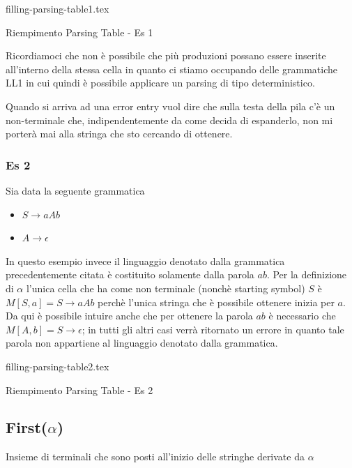 \documentclass[class=book, crop=false, oneside, 12pt]{standalone}
\begin{document}
\begin{table}[H]
	\centering
	{filling-parsing-table1.tex}
    \caption{Riempimento Parsing Table - Es 1}
    \label{filling-parsing-table1}
\end{table} 

Ricordiamoci che non è possibile che più produzioni possano essere inserite all'interno della stessa cella in quanto ci stiamo occupando delle grammatiche LL1 in cui quindi è possibile applicare un parsing di tipo deterministico. 

Quando si arriva ad una error entry vuol dire che sulla testa della pila c'è un non-terminale che, indipendentemente da come decida di espanderlo, non mi porterà mai alla stringa che sto cercando di ottenere. 

\subsubsection{Es 2}
Sia data la seguente grammatica
\begin{itemize}
    \item[] \(S \rightarrow aAb\)
    \item[] \(A \rightarrow \epsilon\)
\end{itemize}

In questo esempio invece il linguaggio denotato dalla grammatica precedentemente citata è costituito solamente dalla parola \(ab\). Per la definizione di \(\alpha\) l'unica cella che ha come non terminale (nonchè starting symbol) \(S\) è \(M[S, a] = S \rightarrow aAb\) perchè l'unica stringa che è possibile ottenere inizia per \(a\). Da qui è possibile intuire anche che per ottenere la parola \(ab\) è necessario che \(M[A, b] = S \rightarrow \epsilon\); in tutti gli altri casi verrà ritornato un errore in quanto tale parola non appartiene al linguaggio denotato dalla grammatica. 

\begin{table}[H]
	\centering
	{filling-parsing-table2.tex}
    \caption{Riempimento Parsing Table - Es 2}
    \label{filling-parsing-table2}
\end{table}

\subsection{First(\(\alpha\))}

Insieme di terminali che sono posti all'inizio delle stringhe derivate da \(\alpha\)
\end{document}
